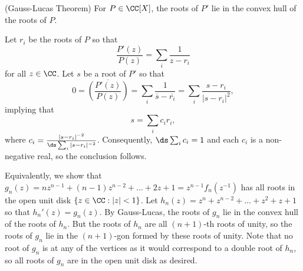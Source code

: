 \begin{solutionlemma}
	(Gauss-Lucas Theorem)
	For $P\in\CC[X]$, the roots of $P'$ lie in the convex hull of the roots of $P$.
\end{solutionlemma}
\begin{lemmaproof}
	Let $r_i$ be the roots of $P$ so that
	\[
		\frac{P'(z)}{P(z)}=\sum_i\frac{1}{z-r_i}
	\]
	for all $z\in\CC$. Let $s$ be a root of $P'$ so that
	\[
		0=\overline{\left(\frac{P'(z)}{P(z)}\right)}=\sum_i\frac{1}{\overline{s}-\overline{r_i}}=\sum_i\frac{s-r_i}{|s-r_i|^2},
	\]
	implying that
	\[
		s=\sum_ic_ir_i,
	\]
	where $c_i=\frac{|s-r_i|^{-2}}{\ds\sum_i|s-r_i|^{-2}}$. Consequently, $\ds\sum_i c_i=1$ and each $c_i$ is a non-negative real, so the conclusion follows.
\end{lemmaproof}

Equivalently, we show that $g_n(z)=nz^{n-1}+(n-1)z^{n-2}+\dots+2z+1=z^{n-1}f_n(z^{-1})$ has all roots in the open unit disk $\{z\in\CC : |z|<1\}$. Let $h_n(z)=z^n+z^{n-2}+\dots+z^2+z+1$ so that $h_n'(z)=g_n(z)$. By Gauss-Lucas, the roots of $g_n$ lie in the convex hull of the roots of $h_n$. But the roots of $h_n$ are all $(n+1)$-th roots of unity, so the roots of $g_n$ lie in the $(n+1)$-gon formed by these roots of unity. Note that no root of $g_n$ is at any of the vertices as it would correspond to a double root of $h_n$, so all roots of $g_n$ are in the open unit disk as desired.
